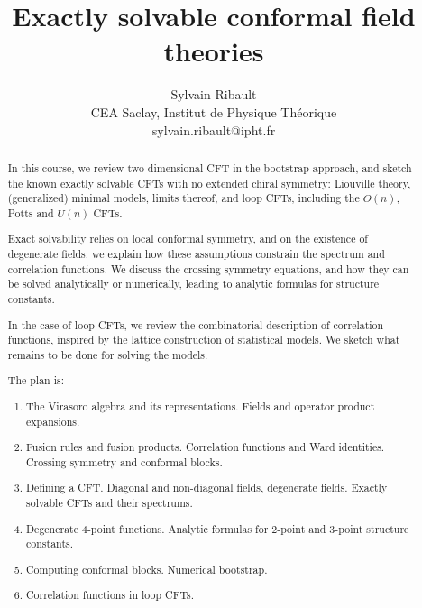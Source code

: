 \documentclass[12pt, a4paper]{article}
\title{\bfseries Exactly solvable conformal field theories}
\author{Sylvain Ribault \vspace{2mm}
\\
{\normalsize CEA Saclay, Institut de Physique Th\'eorique}
 \\
 {\footnotesize \ttfamily sylvain.ribault@ipht.fr }
}
\theoremstyle{break}
\begin{document}
\maketitle


\begin{abstract}
In this course, we review two-dimensional CFT in the bootstrap approach, and sketch the known exactly solvable CFTs with no extended chiral symmetry: Liouville theory, (generalized) minimal models, limits thereof, and loop CFTs, including the $O(n)$, Potts and $U(n)$ CFTs. 

Exact solvability relies on local conformal symmetry, and on the existence of degenerate fields: we explain how these assumptions constrain the spectrum and correlation functions. We discuss the crossing symmetry equations, and how they can be solved analytically or numerically, leading to  
analytic formulas for structure constants. 

In the case of loop CFTs, we review the combinatorial description of correlation functions, inspired by the lattice construction of statistical models. We sketch what remains to be done for solving the models. 


The plan is: 
\begin{enumerate}
 \item The Virasoro algebra and its representations. Fields and operator product expansions.
 \item Fusion rules and fusion products. Correlation functions and Ward identities. Crossing symmetry and conformal blocks. 
 \item Defining a CFT. Diagonal and non-diagonal fields, degenerate fields. Exactly solvable CFTs and their spectrums. 
 \item Degenerate 4-point functions. Analytic formulas for 2-point and 3-point structure constants. 
 \item Computing conformal blocks. Numerical bootstrap.
 \item Correlation functions in loop CFTs. 
\end{enumerate}
\end{abstract}

\vspace{5mm}


\clearpage

\tableofcontents

\hypersetup{linkcolor=blue}

\setcounter{section}{-1}
\end{document}
